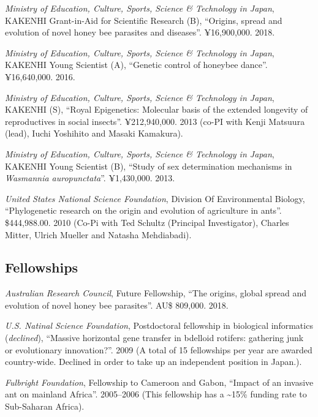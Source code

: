 \documentclass[11pt]{article}
\begin{document}
\ind \textit{Ministry of Education, Culture, Sports, Science \& Technology in Japan}, KAKENHI Grant-in-Aid for Scientific Research (B), ``Origins, spread and evolution of novel honey bee parasites and diseases''.  ¥16,900,000. 2018.


\ind \textit{Ministry of Education, Culture, Sports, Science \& Technology in Japan}, KAKENHI Young Scientist (A), ``Genetic control of honeybee dance''.  ¥16,640,000. 2016.


\ind \textit{Ministry of Education, Culture, Sports, Science \& Technology in Japan}, KAKENHI (S), ``Royal Epigenetics: Molecular basis of the extended longevity of
reproductives in social insects''.  ¥212,940,000. 2013 (co-PI with Kenji Matsuura (lead), Iuchi Yoshihito and Masaki Kamakura).


\ind \textit{Ministry of Education, Culture, Sports, Science \& Technology in Japan}, KAKENHI Young Scientist (B), ``Study of sex determination mechanisms in \textit{Wasmannia auropunctata}''.  ¥1,430,000. 2013.


\ind \textit{United States National Science Foundation}, Division Of Environmental Biology, ``Phylogenetic research on the origin and evolution of agriculture in ants''.  \$444,988.00. 2010 (Co-Pi with Ted Schultz (Principal Investigator), Charles Mitter, Ulrich
Mueller and Natasha Mehdiabadi).






\subsection{Fellowships}


\ind \textit{Australian Research Council}, Future Fellowship, ``The origins, global spread and evolution of novel honey bee parasites''.  AU\$ 809,000. 2018.








\ind \textit{U.S. Natinal Science Foundation}, Postdoctoral fellowship in biological informatics (\textit{declined}), ``Massive horizontal gene transfer in bdelloid rotifers: gathering junk or
evolutionary innovation?''.  2009 (A total of 15 fellowships per year are awarded country-wide. Declined in
order to take up an independent position in Japan.).


\ind \textit{Fulbright Foundation}, Fellowship to Cameroon and Gabon, ``Impact of an invasive ant on mainland Africa''.  2005--2006 (This fellowship has a \textasciitilde{}15\% funding rate to Sub-Saharan
Africa).
\end{document}
